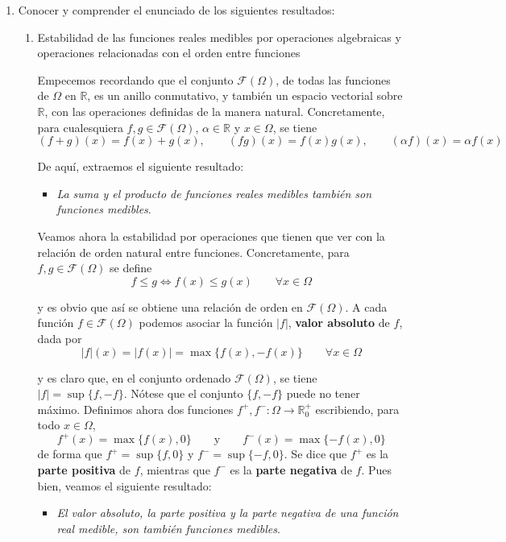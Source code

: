\documentclass[a4paper, 12pt]{article}
\begin{document}
\begin{enumerate}[label=\textbf{\arabic*}.]
\item Conocer y comprender el enunciado de los siguientes resultados:

\begin{enumerate}[label=\textit{\alph*)}]
	\item Estabilidad de las funciones reales medibles por operaciones algebraicas y operaciones relacionadas con el orden entre funciones
	
	Empecemos recordando que el conjunto \(\mathcal{F}(\Omega)\), de todas las funciones de \(\Omega\) en \(\mathbb{R}\), es un anillo conmutativo, y también un espacio vectorial sobre \(\mathbb{R}\), con las operaciones definidas de la manera natural. Concretamente, para cualesquiera \(f,g \in \mathcal{F}(\Omega)\), \(\alpha \in \mathbb{R}\) y \(x \in \Omega\), se tiene
	\[
		(f + g)(x) = f(x) + g(x), \qquad (fg)(x) = f(x)g(x), \qquad (\alpha f) (x) = \alpha f(x)
	\]
	
	De aquí, extraemos el siguiente resultado:
	\begin{itemize}
		\item \textit{La suma y el producto de funciones reales medibles también son funciones medibles}.
	\end{itemize}
	
	\medskip

	Veamos ahora la estabilidad por operaciones que tienen que ver con la relación de orden natural entre funciones. Concretamente, para \(f,g \in \mathcal{F} (\Omega)\) se define
	\[
		f \leq g \Leftrightarrow f(x) \leq g(x) \qquad \forall x \in \Omega
	\]
	
	y es obvio que así se obtiene una relación de orden en \(\mathcal{F}(\Omega)\). A cada función \(f \in \mathcal{F}(\Omega)\) podemos asociar la función \(|f|\), \textbf{valor absoluto} de \(f\), dada por
	\[
		|f| (x) = |f(x)| = \max \{f(x), - f(x)\} \qquad \forall x \in \Omega
	\]
	
	y es claro que, en el conjunto ordenado \(\mathcal{F}(\Omega)\), se tiene \(|f| = \sup \{f, -f\}\). Nótese que el conjunto \(\{f, -f\}\) puede no tener máximo. Definimos ahora dos funciones \(f^+, f^- : \Omega \to \mathbb{R}_0^+\) escribiendo, para todo \(x \in \Omega\),
	\[
		f^+ (x) = \max \{f(x), 0\} \qquad \text{y} \qquad f^- (x) = \max \{-f(x), 0\}
	\]
	de forma que \(f^+ = \sup \{f, 0\}\) y \(f^- = \sup \{-f,0\}\). Se dice que \(f^+\) es la \textbf{parte positiva} de \(f\), mientras que \(f^-\) es la \textbf{parte negativa} de \(f\). Pues bien, veamos el siguiente resultado:
	\begin{itemize}
		\item \textit{El valor absoluto, la parte positiva y la parte negativa de una función real medible, son también funciones medibles}.
	\end{itemize}
	

\end{enumerate}
\end{enumerate}
\end{document}
